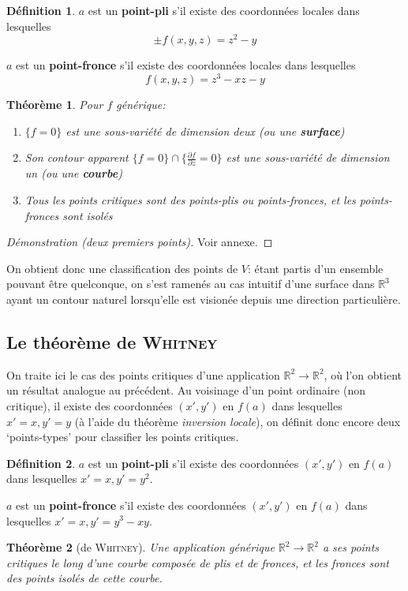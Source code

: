 \documentclass{article}
\newcommand{\R}{\mathbb{R}}
\newtheorem{thm}{Théorème}
\theoremstyle{definition}
\newtheorem{defn}{Définition}
\begin{document}
\begin{defn}
	$a$ est un \textbf{point-pli} s'il existe des coordonnées locales dans lesquelles
	$$\pm f(x, y, z) = z^2 - y$$

	$a$ est un \textbf{point-fronce} s'il existe des coordonnées locales dans lesquelles
	$$f(x,y,z) = z^3 - xz - y$$
\end{defn}

\begin{thm}
	Pour $f$ générique:
	\begin{enumerate}
		\item $\{f=0\}$ est une sous-variété de dimension deux (ou une \textbf{surface})
		\item Son contour apparent $\{f=0\}\cap \{\frac{\partial f}{\partial z}=0\}$ est une sous-variété de dimension un (ou une \textbf{courbe})
		\item Tous les points critiques sont des points-plis ou points-fronces, et les points-fronces sont isolés
	\end{enumerate}
\end{thm}

\begin{proof}[Démonstration (deux premiers points)] Voir annexe. \end{proof}

On obtient donc une classification des points de $V$: étant partis d'un ensemble pouvant être quelconque, on s'est ramenés au cas intuitif d'une surface dans $\R^3$ ayant un contour naturel lorsqu'elle est visionée depuis une direction particulière.

\subsection{Le théorème de \textsc{Whitney}}

On traite ici le cas des points critiques d'une application $\R^2\to\R^2$, où l'on obtient un résultat analogue au précédent.
Au voisinage d'un point ordinaire (non critique), il existe des coordonnées $(x',y')$ en $f(a)$ dans lesquelles $x' = x, y' = y$ (à l'aide du théorème \textit{inversion locale}), on définit donc encore deux `points-types' pour classifier les points critiques.

\begin{defn}
	$a$ est un \textbf{point-pli} s'il existe des coordonnées $(x',y')$ en $f(a)$ dans lesquelles $x' = x, y' = y^2$.

	$a$ est un \textbf{point-fronce} s'il existe des coordonnées $(x',y')$ en $f(a)$ dans lesquelles $x' = x, y' = y^3 - xy$.
\end{defn}

\begin{thm}[de \textsc{Whitney}]
	Une application générique $\R^2\to\R^2$ a ses points critiques le long d'une courbe composée de plis et de fronces, et les fronces sont des points isolés de cette courbe.
\end{thm}
\end{document}
